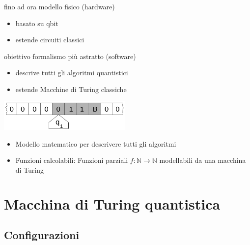 \documentclass{beamer}
\begin{document}
\begin{frame}{\subsecname}{}
	\begin{block}{fino ad ora}
		modello fisico (hardware)
		\begin{itemize}
			\item basato su qbit
			\item estende circuiti classici
		\end{itemize}
	\end{block}

	\pause \vspace{2ex}

	\begin{block}{obiettivo}
		formalismo più astratto (software)
		\begin{itemize}
			\item descrive tutti gli algoritmi quantistici
			\item estende Macchine di Turing classiche
		\end{itemize}
	\end{block}
\end{frame}

\begin{frame}{\subsecname}{}
	\centering\includegraphics[width=6.5cm]{Turing_machine_2b.png}
	\begin{itemize}
		\item<+-> Modello matematico per descrivere tutti gli algoritmi
		\item<+-> \alert{Funzioni calcolabili}: Funzioni parziali \( f : \mathbb{N} \rightarrow \mathbb{N} \) modellabili da una macchina di Turing
	\end{itemize}
\end{frame}

\section{Macchina di Turing quantistica}

\subsection{Configurazioni}
\end{document}
